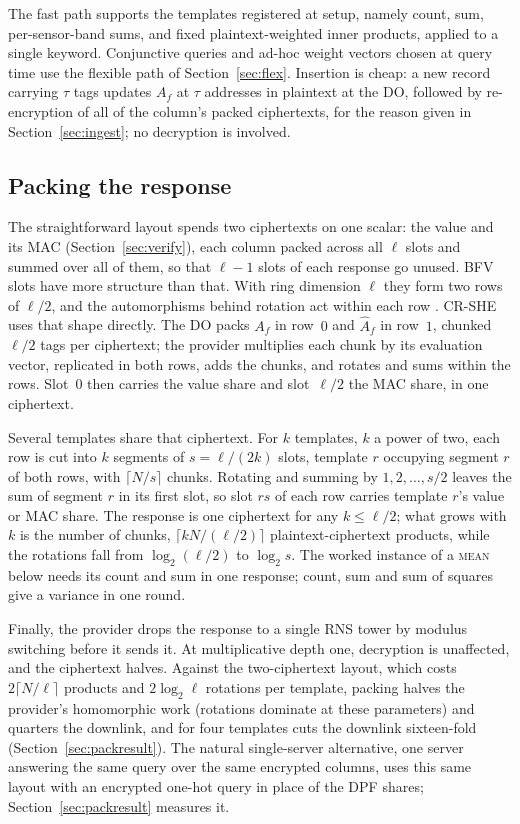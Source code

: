 \documentclass[a4paper,fleqn]{cas-sc}
\begin{document}
The fast path supports the templates registered at setup, namely count, sum,
per-sensor-band sums, and fixed plaintext-weighted inner products, applied to
a single keyword. Conjunctive queries and ad-hoc weight vectors chosen at
query time use the flexible path of Section~\ref{sec:flex}. Insertion is
cheap: a new record carrying $\tau$ tags updates $A_f$ at $\tau$ addresses in
plaintext at the DO, followed by re-encryption of all of the column's packed
ciphertexts, for the reason given in Section~\ref{sec:ingest}; no decryption
is involved.

\subsection{Packing the response}
\label{sec:packing}
The straightforward layout spends two ciphertexts on one scalar: the value and its MAC
(Section~\ref{sec:verify}), each column packed across all $\ell$ slots and
summed over all of them, so that $\ell-1$ slots of each response go unused.
BFV slots have more structure than that. With ring dimension $\ell$ they form
two rows of $\ell/2$, and the automorphisms behind rotation act within each row
\citep{halevi2014algorithms}. CR-SHE uses that shape directly. The DO packs
$A_f$ in row~$0$ and $\widehat{A}_f$ in row~$1$, chunked $\ell/2$ tags per
ciphertext; the provider multiplies each chunk by its evaluation vector,
replicated in both rows, adds the chunks, and rotates and sums within the rows.
Slot~$0$ then carries the value share and slot~$\ell/2$ the MAC share, in one
ciphertext.

Several templates share that ciphertext. For $k$ templates, $k$ a power of
two, each row is cut into $k$ segments of $s=\ell/(2k)$ slots, template $r$
occupying segment $r$ of both rows, with $\lceil N/s\rceil$ chunks. Rotating
and summing by $1,2,\dots,s/2$ leaves the sum of segment $r$ in its first slot,
so slot $rs$ of each row carries template $r$'s value or MAC share. The
response is one ciphertext for any $k\le\ell/2$; what grows with $k$ is the
number of chunks, $\lceil kN/(\ell/2)\rceil$ plaintext-ciphertext products,
while the rotations fall from $\log_2(\ell/2)$ to $\log_2 s$. The worked
instance of a \textsc{mean} below needs its count and sum in one response;
count, sum and sum of squares give a variance in one round.

Finally, the provider drops the response to a single RNS tower by modulus
switching before it sends it. At multiplicative depth one, decryption is
unaffected, and the ciphertext halves. Against the two-ciphertext layout, which
costs $2\lceil N/\ell\rceil$ products and $2\log_2\ell$ rotations per template,
packing halves the provider's homomorphic work (rotations dominate at these
parameters) and quarters the downlink, and for four templates cuts the
downlink sixteen-fold (Section~\ref{sec:packresult}). The natural single-server
alternative, one server answering the same query over the same encrypted
columns, uses this same layout with an encrypted one-hot
query in place of the DPF shares; Section~\ref{sec:packresult} measures it.
\end{document}
